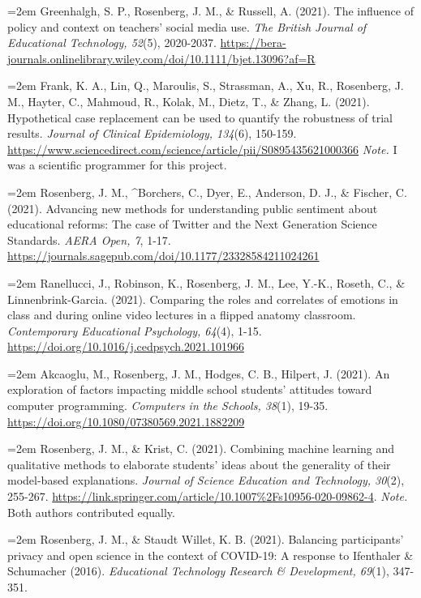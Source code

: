 \documentclass[
  14,
]{article}
\begin{document}
\hangindent=2em Greenhalgh, S. P., Rosenberg, J. M., \& Russell, A.
(2021). The influence of policy and context on teachers' social media
use. \emph{The British Journal of Educational Technology, 52}(5),
2020-2037.
\url{https://bera-journals.onlinelibrary.wiley.com/doi/10.1111/bjet.13096?af=R}

\hangindent=2em Frank, K. A., Lin, Q., Maroulis, S., Strassman, A., Xu,
R., Rosenberg, J. M., Hayter, C., Mahmoud, R., Kolak, M., Dietz, T., \&
Zhang, L. (2021). Hypothetical case replacement can be used to quantify
the robustness of trial results. \emph{Journal of Clinical Epidemiology,
134}(6), 150-159.
\url{https://www.sciencedirect.com/science/article/pii/S0895435621000366}
\emph{Note.} I was a scientific programmer for this project.

\hangindent=2em Rosenberg, J. M., \^{}Borchers, C., Dyer, E., Anderson,
D. J., \& Fischer, C. (2021). Advancing new methods for understanding
public sentiment about educational reforms: The case of Twitter and the
Next Generation Science Standards. \emph{AERA Open, 7}, 1-17.
\url{https://journals.sagepub.com/doi/10.1177/23328584211024261}

\hangindent=2em Ranellucci, J., Robinson, K., Rosenberg, J. M., Lee,
Y.-K., Roseth, C., \& Linnenbrink-Garcia. (2021). Comparing the roles
and correlates of emotions in class and during online video lectures in
a flipped anatomy classroom. \emph{Contemporary Educational Psychology,
64}(4), 1-15. \url{https://doi.org/10.1016/j.cedpsych.2021.101966}

\hangindent=2em Akcaoglu, M., Rosenberg, J. M., Hodges, C. B., Hilpert,
J. (2021). An exploration of factors impacting middle school students'
attitudes toward computer programming. \emph{Computers in the Schools,
38}(1), 19-35. \url{https://doi.org/10.1080/07380569.2021.1882209}

\hangindent=2em Rosenberg, J. M., \& Krist, C. (2021). Combining machine
learning and qualitative methods to elaborate students' ideas about the
generality of their model-based explanations. \emph{Journal of Science
Education and Technology, 30}(2), 255-267.
\url{https://link.springer.com/article/10.1007\%2Fs10956-020-09862-4}.
\emph{Note.} Both authors contributed equally.

\hangindent=2em Rosenberg, J. M., \& Staudt Willet, K. B. (2021).
Balancing participants' privacy and open science in the context of
COVID-19: A response to Ifenthaler \& Schumacher (2016).
\emph{Educational Technology Research \& Development, 69}(1), 347-351.
\end{document}
